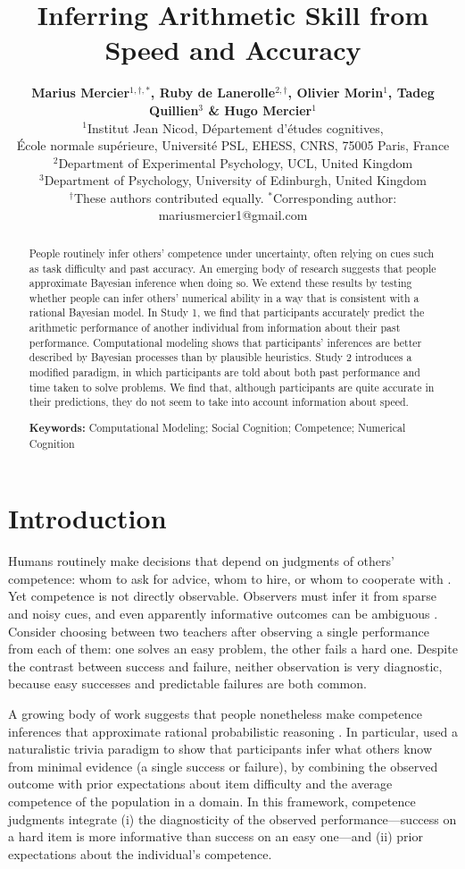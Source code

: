 \documentclass[10pt,letterpaper]{article}
\title{Inferring Arithmetic Skill from Speed and Accuracy}
\author{
  {\large\bfseries Marius Mercier$^{1,\dagger,*}$, Ruby de Lanerolle$^{2,\dagger}$, Olivier Morin$^1$, Tadeg Quillien$^3$ \& Hugo Mercier$^1$} \\
  {\normalsize\normalfont
    $^1$Institut Jean Nicod, Département d’études cognitives,\\ École normale supérieure, Université PSL, EHESS, CNRS, 75005 Paris, France \\
    $^2$Department of Experimental Psychology, UCL, United Kingdom \\
    $^3$Department of Psychology, University of Edinburgh, United Kingdom \\
    $^\dagger$These authors contributed equally. $^*$Corresponding author: mariusmercier1@gmail.com
  }
}
\begin{document}
\maketitle

\begin{abstract}
People routinely infer others' competence under uncertainty, often relying on cues such as task difficulty and past accuracy. An emerging body of research suggests that people approximate Bayesian inference when doing so. We extend these results by testing whether people can infer others' numerical ability in a way that is consistent with a rational Bayesian model. In Study 1, we find that participants accurately predict the arithmetic performance of another individual from information about their past performance. Computational modeling shows that participants' inferences are better described by Bayesian processes than by plausible heuristics. Study 2 introduces a modified paradigm, in which participants are told about both past performance and time taken to solve problems. We find that, although participants are quite accurate in their predictions, they do not seem to take into account information about speed.

\textbf{Keywords:}
Computational Modeling;
Social Cognition;
Competence;
Numerical Cognition
\end{abstract}

\section{Introduction}\label{introduction}

Humans routinely make decisions that depend on judgments of others’ competence: whom to ask for advice, whom to hire, or whom to cooperate with \citep{Harris-2018,Cuddy-2011,Xiang-2023}. Yet competence is not directly observable. Observers must infer it from sparse and noisy cues, and even apparently informative outcomes can be ambiguous \citep{Jones-1989,Rasch-1960}. Consider choosing between two teachers after observing a single performance from each of them: one solves an easy problem, the other fails a hard one. Despite the contrast between success and failure, neither observation is very diagnostic, because easy successes and predictable failures are both common.

A growing body of work suggests that people nonetheless make competence inferences that approximate rational probabilistic reasoning \citep{Baker-2017,Davis-2025,Jara-Ettinger-2017,Xiang-2026,Jansen-2021,Aboody-2025}. In particular, \citet{Mercier-2026} used a naturalistic trivia paradigm to show that participants infer what others know from minimal evidence (a single success or failure), by combining the observed outcome with prior expectations about item difficulty and the average competence of the population in a domain. In this framework, competence judgments integrate (i) the diagnosticity of the observed performance—success on a hard item is more informative than success on an easy one—and (ii) prior expectations about the individual's competence.
\end{document}
